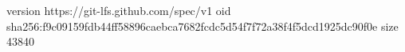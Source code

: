 version https://git-lfs.github.com/spec/v1
oid sha256:f9c09159fdb44ff58896caebca7682fcdc5d54f7f72a38f4f5dcd1925dc90f0e
size 43840
